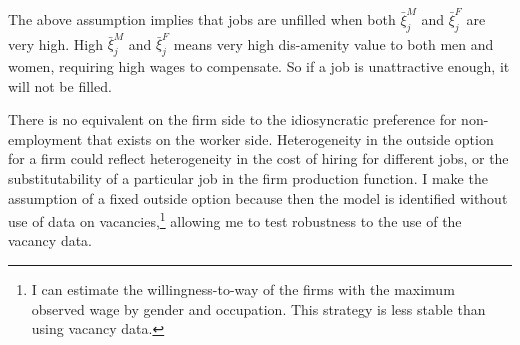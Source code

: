 \documentclass[11pt]{article}
\begin{document}
The above assumption implies that jobs are unfilled when both $\bar{\xi}^M_j$ and $\bar{\xi}^F_j$ are very high. High $\bar{\xi}^M_j$ and $\bar{\xi}^F_j$ means very high dis-amenity value to both men and women, requiring high wages to compensate. So if a job is unattractive enough, it will not be filled.

There is no equivalent on the firm side to the idiosyncratic preference for non-employment that exists on the worker side. Heterogeneity in the outside option for a firm could reflect heterogeneity in the cost of hiring for different jobs, or the substitutability of a particular job in the firm production function. I make the assumption of a fixed outside option because then the model is identified without use of data on vacancies,\footnote{I can estimate the willingness-to-way of the firms with the maximum observed wage by gender and occupation. This strategy is less stable than using vacancy data.} allowing me to test robustness to the use of the vacancy data.







\end{document}
